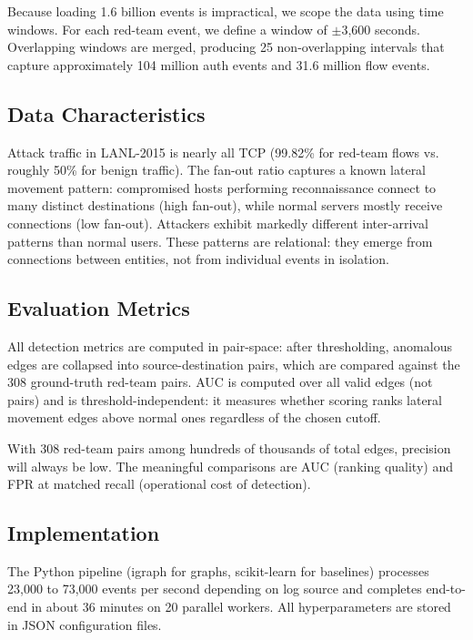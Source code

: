 \documentclass[letterpaper,twocolumn,10pt]{article}
\begin{document}
Because loading 1.6 billion events is impractical, we scope the data using time windows. For each red-team event, we define a window of $\pm$3,600 seconds. Overlapping windows are merged, producing 25 non-overlapping intervals that capture approximately 104 million auth events and 31.6 million flow events.

\subsection{Data Characteristics}

Attack traffic in LANL-2015 is nearly all TCP (99.82\% for red-team flows vs. roughly 50\% for benign traffic). The fan-out ratio captures a known lateral movement pattern: compromised hosts performing reconnaissance connect to many distinct destinations (high fan-out), while normal servers mostly receive connections (low fan-out). Attackers exhibit markedly different inter-arrival patterns than normal users. These patterns are relational: they emerge from connections between entities, not from individual events in isolation.

\subsection{Evaluation Metrics}

All detection metrics are computed in pair-space: after thresholding, anomalous edges are collapsed into source-destination pairs, which are compared against the 308 ground-truth red-team pairs. AUC is computed over all valid edges (not pairs) and is threshold-independent: it measures whether scoring ranks lateral movement edges above normal ones regardless of the chosen cutoff.

With 308 red-team pairs among hundreds of thousands of total edges, precision will always be low. The meaningful comparisons are AUC (ranking quality) and FPR at matched recall (operational cost of detection).

\subsection{Implementation}

The Python pipeline (igraph for graphs, scikit-learn for baselines) processes 23,000 to 73,000 events per second depending on log source and completes end-to-end in about 36 minutes on 20 parallel workers. All hyperparameters are stored in JSON configuration files. 
\end{document}
